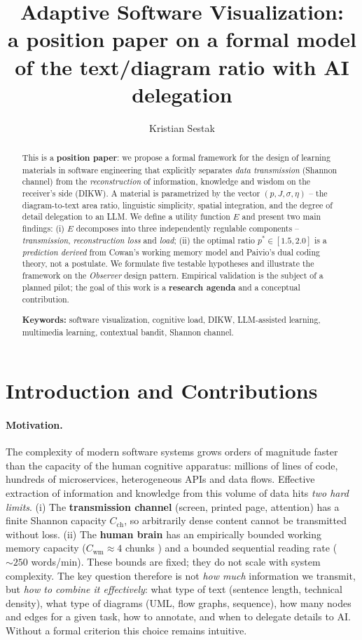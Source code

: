 \documentclass[10pt,a4paper]{article}
\title{\vspace{-1.5em}Adaptive Software Visualization:\\
\large a position paper on a formal model of the text/diagram ratio with AI delegation}
\author{Kristian Sestak}
\date{}
\begin{document}
\maketitle
\vspace{-2em}

\begin{abstract}
\noindent
This is a \textbf{position paper}: we propose a formal framework for the
design of learning materials in software engineering that explicitly
separates \emph{data transmission} (Shannon channel) from the
\emph{reconstruction} of information, knowledge and wisdom on the
receiver's side (DIKW). A material is parametrized by the vector
$(p, J, \sigma, \eta)$ – the diagram-to-text area ratio, linguistic
simplicity, spatial integration, and the degree of detail delegation to
an LLM. We define a utility function $E$ and present two main findings:
(i) $E$ decomposes into three independently regulable components –
\emph{transmission}, \emph{reconstruction loss} and \emph{load};
(ii) the optimal ratio $p^{*} \in [1.5, 2.0]$ is a \emph{prediction
derived} from Cowan's working memory model and Paivio's dual coding
theory, not a postulate. We formulate five testable hypotheses and
illustrate the framework on the \emph{Observer} design pattern.
Empirical validation is the subject of a planned pilot; the goal of
this work is a \textbf{research agenda} and a conceptual contribution.

\smallskip
\noindent\textbf{Keywords:} software visualization, cognitive load,
DIKW, LLM-assisted learning, multimedia learning, contextual bandit,
Shannon channel.
\end{abstract}

\section{Introduction and Contributions}

\paragraph{Motivation.}
The complexity of modern software systems grows orders of magnitude
faster than the capacity of the human cognitive apparatus: millions of
lines of code, hundreds of microservices, heterogeneous APIs and data
flows. Effective extraction of information and knowledge from this
volume of data hits \emph{two hard limits}. (i) The \textbf{transmission
channel} (screen, printed page, attention) has a finite Shannon capacity
$C_{\text{ch}}$, so arbitrarily dense content cannot be transmitted
without loss. (ii) The \textbf{human brain} has an empirically bounded
working memory capacity ($C_{\text{wm}} \approx 4$ chunks
\cite{cowan2001}) and a bounded sequential reading rate
($\sim\!250$ words/min). These bounds are fixed; they do not scale with
system complexity. The key question therefore is not \emph{how much}
information we transmit, but \emph{how to combine it effectively}:
what type of text (sentence length, technical density), what type of
diagrams (UML, flow graphs, sequence), how many nodes and edges for a
given task, how to annotate, and when to delegate details to AI.
Without a formal criterion this choice remains intuitive.
\end{document}

